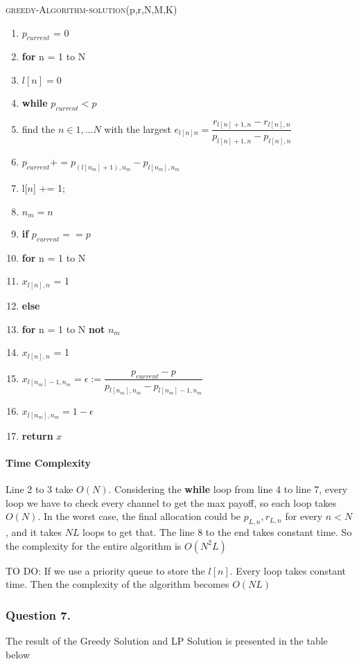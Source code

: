 \documentclass[11pt, oneside]{report}
\begin{document}
\noindent\textsc{greedy-Algorithm-solution}(p,r,N,M,K)
\begin{enumerate}[1\ ]
\setlength{\topsep}{0.05ex}
\setlength{\itemsep}{0.05ex}
\item $p_{current}$ = 0
\item \textbf{for} n = 1 to N
\item \qquad $l[n] = 0$
\item \textbf{while} $p_{current} < p$
\item \qquad  find the $n \in {1,...N}$ with the largest $e_{l[n]n} = \dfrac{r_{l[n]+1,n} - r_{l[n],n}}{p_{l[n]+1,n} - p_{l[n],n}}$
\item \qquad  $p_{current} += p_{(l[n_{m}] + 1), n_{m}} - p_{l[n_{m}], n_{m}}$
\item \qquad  l[$n$] += 1;
\item \qquad $n_m = n$
\item \textbf{if} $p_{current} == p$
\item \qquad \textbf{for} n = 1 to N
\item \qquad \qquad $x_{l[n],n}$ = 1
\item \textbf{else}
\item \qquad \textbf{for} n = 1 to N \textbf{not} $n_m$
\item \qquad \qquad $x_{l[n],n}$ = 1
\item \qquad $x_{l[n_m] - 1,n_m} = \epsilon := \dfrac{p_{current} - p}{p_{l[n_m],n_m} - p_{l[n_m]-1,n_m}}$
\item \qquad $x_{l[n_m],n_m} = 1 - \epsilon$
\item \textbf{return} $x$
\end{enumerate}

\paragraph{Time Complexity} Line 2 to 3 take $O(N)$. Considering the \textbf{while} loop from line 4 to line 7, every loop we have to check every channel to get the max payoff, so each loop takes $O(N)$. In the worst case, the final allocation could be $p_{L,n}, r_{L,n}$ for every $n < N$, and it takes $NL$ loops to get that. The line 8 to the end  takes constant time. So the complexity for the entire algorithm is $O(N^2L)$

TO DO: If we use a priority queue to store the $l[n]$. Every loop takes constant time. Then the complexity of the algorithm becomes $O(N L)$

\subsubsection{Question 7. }
The result of the Greedy Solution and LP Solution is presented in the table below
\end{document}
